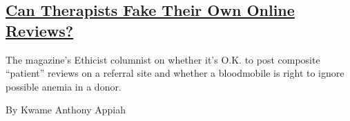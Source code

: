 \begin{enumerate}
  \hypertarget{can-therapists-fake-their-own-online-reviews}{%
  \subsection{\texorpdfstring{\href{/2017/02/22/magazine/can-therapists-fake-their-own-online-reviews.html}{Can
  Therapists Fake Their Own Online
  Reviews?}}{Can Therapists Fake Their Own Online Reviews?}}\label{can-therapists-fake-their-own-online-reviews}}

  The magazine's Ethicist columnist on whether it's O.K. to post
  composite ``patient'' reviews on a referral site and whether a
  bloodmobile is right to ignore possible anemia in a donor.

  By Kwame Anthony Appiah
\end{enumerate}


